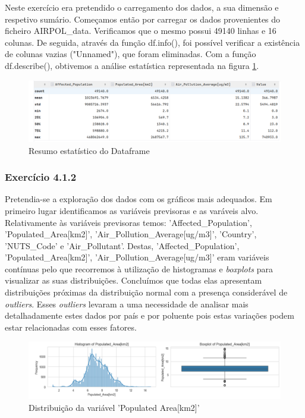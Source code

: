 \documentclass[conference]{IEEEtran}
\begin{document}
Neste exercício era pretendido o carregamento dos dados, a sua dimensão e respetivo sumário. 
Começamos então por carregar os dados provenientes do ficheiro AIRPOL\_data. Verificamos que o mesmo possui 49140 linhas e 16 colunas. De seguida, através da função df.info(), foi possível verificar a existência de colunas vazias ("Unnamed"), que foram eliminadas. Com a função df.describe(), obtivemos a análise estatística representada na figura \ref{fig:Statistics}.

\begin{figure}[H]
	\centering
	\includegraphics[width=1\linewidth]{statistics}
	\caption{Resumo estatístico do Dataframe}
	\label{fig:Statistics}
\end{figure}


\medskip
\subsubsection{\textbf{Exercício 4.1.2}}

Pretendia-se a exploração dos dados com os gráficos mais adequados. Em primeiro lugar identificamos as variáveis previsoras e as varáveis alvo. Relativamente às variáveis previsoras temos: 'Affected\_Population', 'Populated\_Area[km2]', 'Air\_Pollution\_Average[ug/m3]', 'Country', 'NUTS\_Code' e 'Air\_Pollutant'. Destas, 'Affected\_Population', 'Populated\_Area[km2]', 'Air\_Pollution\_Average[ug/m3]' eram variáveis contínuas pelo que recorremos à utilização de histogramas e \textit{boxplots} para visualizar as suas distribuições. Concluímos que todas elas apresentam distribuições próximas da distribuição normal com a presença considerável de \textit{outliers}. Esses \textit{outliers} levaram a uma necessidade de analisar mais detalhadamente estes dados por país e por poluente pois estas variações podem estar relacionadas com esses fatores. 

\begin{figure}[H]
	\centering
	\includegraphics[width=1\linewidth]{PopArea}
	\caption{Distribuição da variável 'Populated Area[km2]'}
	\label{fig:PopArea}
\end{figure}
\end{document}
